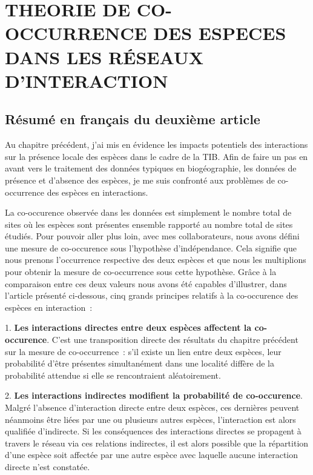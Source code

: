 \chapter{THEORIE DE CO-OCCURRENCE DES ESPECES DANS LES RÉSEAUX D'INTERACTION}
\label{chap2}

\section{Résumé en français du deuxième article}

Au chapitre précédent, j'ai mis en évidence les impacts potentiels des interactions sur la présence locale des espèces dans le cadre de la TIB. Afin de faire un pas en avant vers le traitement des données typiques en biogéographie, les données de présence et d'absence des espèces, je me suis confronté aux problèmes de co-occurrence des espèces en interactions.

La co-occurence observée dans les données est simplement le nombre total de sites où les espèces sont présentes ensemble rapporté au nombre total de sites étudiés. Pour pouvoir aller plus loin, avec mes collaborateurs, nous avons défini une mesure de co-occurence sous l'hypothèse d'indépendance. Cela signifie que nous prenons l'occurrence respective des deux espèces et que nous les multiplions pour obtenir la mesure de co-occurrence sous cette hypothèse. Grâce à la comparaison entre ces deux valeurs nous avons été capables d'illustrer, dans l'article présenté ci-dessous, cinq grands principes relatifs à la co-occurence des espèces en interaction~:

1. \textbf{Les interactions directes entre deux espèces affectent la co-occurence}. C'est une transposition directe des résultats du chapitre précédent sur la mesure de co-occurrence~: s'il existe un lien entre deux espèces, leur probabilité d'être présentes simultanément dans une localité diffère de la probabilité attendue si elle se rencontraient aléatoirement.

2. \textbf{Les interactions indirectes modifient la probabilité de co-occurence}. Malgré l'absence d'interaction directe entre deux espèces, ces dernières peuvent néanmoins être liées par une ou plusieurs autres espèces, l'interaction est alors qualifiée d'indirecte. Si les conséquences des interactions directes se propagent à travers le réseau via ces relations indirectes, il est alors possible que la répartition d'une espèce soit affectée par une autre espèce avec laquelle aucune interaction directe n'est constatée.

